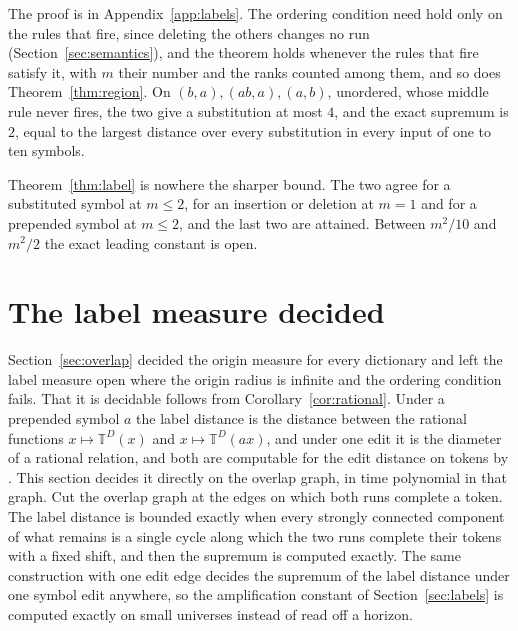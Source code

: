 \documentclass[11pt,a4paper]{article}
\theoremstyle{definition}
\theoremstyle{plain}
\newcommand{\T}{\mathbb{T}}
\begin{document}

The proof is in Appendix~\ref{app:labels}. The ordering condition need hold only on the rules that fire, since deleting
the others changes no run (Section~\ref{sec:semantics}), and the theorem holds whenever the rules that fire satisfy it,
with \(m\) their number and the ranks counted among them, and so does Theorem~\ref{thm:region}. On
\((b, a), (ab, a), (a, b)\), unordered, whose middle rule never fires, the two give a substitution at most \(4\), and
the exact supremum is \(2\), equal to the largest distance over every substitution in every input of one to ten symbols.

Theorem~\ref{thm:label} is nowhere the sharper bound. The two agree for a substituted symbol at \(m \le 2\), for an
insertion or deletion at \(m = 1\) and for a prepended symbol at \(m \le 2\), and the last two are attained. Between
\(m^2/10\) and \(m^2/2\) the exact leading constant is open.

\section{The label measure decided}\label{sec:labelgraph}

Section~\ref{sec:overlap} decided the origin measure for every dictionary and left the label measure open where the
origin radius is infinite and the ordering condition fails. That it is decidable follows from
Corollary~\ref{cor:rational}. Under a prepended symbol \(a\) the label distance is the distance between the rational
functions \(x \mapsto \T^D(x)\) and \(x \mapsto \T^D(ax)\), and under one edit it is the diameter of a rational
relation, and both are computable for the edit distance on tokens by \citet[Theorem~3.25 and
Corollary~3.12]{aiswarya2024edit}. This section decides it directly on the overlap graph, in time polynomial in that
graph. Cut the overlap graph at the edges on which both runs complete a token. The label distance is bounded exactly
when every strongly connected component of what remains is a single cycle along which the two runs complete their tokens
with a fixed shift, and then the supremum is computed exactly. The same construction with one edit edge decides the
supremum of the label distance under one symbol edit anywhere, so the amplification constant of Section~\ref{sec:labels}
is computed exactly on small universes instead of read off a horizon.
\end{document}
